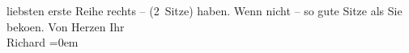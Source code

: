 \begin{ledgroupsized}[t]{13cm}
               liebsten erste Reihe rechts – (2 Sitze) haben. Wenn nicht – so gute Sitze als Sie
                  beko{\geminationm}en.\pend
           \pstart
           Von Herzen Ihr{\\[\baselineskip]}\spacefill\mbox{Richard}\pend
           \leftskip=0em{}\endnumbering{}\end{ledgroupsized}  \newcommand{\dateiname}{L01558}\newcommand{\titel}{Richard Beer-Hofmann an Arthur Schnitzler, [7. 10. 1905]}\newcommand{\editorInnen}{Martin Anton Müller und Gerd-Hermann Susen}
      